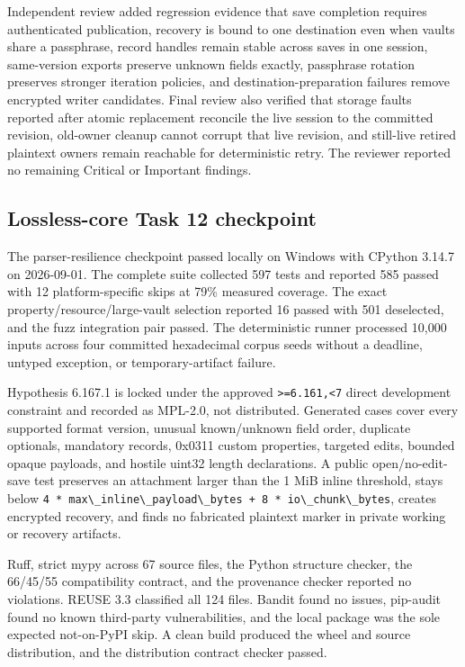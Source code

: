 \documentclass[
  letterpaper,
]{article}
\newcommand{\passthrough}[1]{#1}
\begin{document}
Independent review added regression evidence that save completion requires authenticated publication, recovery is bound
to one destination even when vaults share a passphrase, record handles remain stable across saves in one session,
same-version exports preserve unknown fields exactly, passphrase rotation preserves stronger iteration policies, and
destination-preparation failures remove encrypted writer candidates. Final review also verified that storage faults
reported after atomic replacement reconcile the live session to the committed revision, old-owner cleanup cannot corrupt
that live revision, and still-live retired plaintext owners remain reachable for deterministic retry. The reviewer
reported no remaining Critical or Important findings.

\subsection{Lossless-core Task 12 checkpoint}\label{lossless-core-task-12-checkpoint}

The parser-resilience checkpoint passed locally on Windows with CPython 3.14.7 on 2026-09-01. The complete suite
collected 597 tests and reported 585 passed with 12 platform-specific skips at 79\% measured coverage. The exact
property/resource/large-vault selection reported 16 passed with 501 deselected, and the fuzz integration pair passed.
The deterministic runner processed 10,000 inputs across four committed hexadecimal corpus seeds without a deadline,
untyped exception, or temporary-artifact failure.

Hypothesis 6.167.1 is locked under the approved \nolinkurl{>=6.161,<7} direct development constraint and recorded as
MPL-2.0, not distributed. Generated cases cover every supported format version, unusual known/unknown field order,
duplicate optionals, mandatory records, 0x0311 custom properties, targeted edits, bounded opaque payloads, and hostile
uint32 length declarations. A public open/no-edit-save test preserves an attachment larger than the 1 MiB inline
threshold, stays below \passthrough{\lstinline!4 * max\_inline\_payload\_bytes + 8 * io\_chunk\_bytes!}, creates
encrypted recovery, and finds no fabricated plaintext marker in private working or recovery artifacts.

Ruff, strict mypy across 67 source files, the Python structure checker, the 66/45/55 compatibility contract, and the
provenance checker reported no violations. REUSE 3.3 classified all 124 files. Bandit found no issues, pip-audit found
no known third-party vulnerabilities, and the local package was the sole expected not-on-PyPI skip. A clean build
produced the wheel and source distribution, and the distribution contract checker passed.
\end{document}
